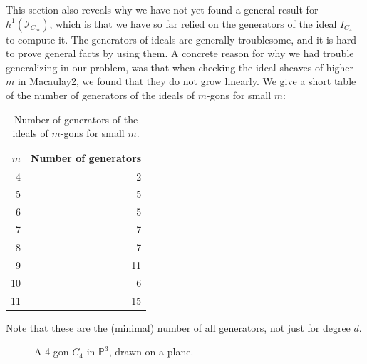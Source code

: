 This section also reveals why we have not yet found a general result for $h^1(\mathcal{I}_{C_m})$, which is that we have so far relied on the generators of the ideal $I_{C_4}$ to compute it. The generators of ideals are generally troublesome, and it is hard to prove general facts by using them. A concrete reason for why we had trouble generalizing in our problem, was that when checking the ideal sheaves of higher $m$ in Macaulay2, we found that they do not grow linearly. We give a short table of the number of generators of the ideals of $m$-gons for small $m$:

\begin{table}[htbp]
    \centering
    \caption{Number of generators of the ideals of $m$-gons for small $m$.}
    \label{tab:num-generators}
    \begin{tabular}{r r }
        \toprule
        $m$ & Number of generators \\
        \midrule
        4 & 2 \\
        5 & 5 \\
        6 & 5 \\
        7 & 7 \\
        8 & 7 \\
        9 & 11 \\
        10 & 6 \\
        11 & 15 \\
        \bottomrule
    \end{tabular}
\end{table}

Note that these are the (minimal) number of all generators, not just for degree $d$.

\begin{figure}
    \centering
    
    \caption{A 4-gon $C_4$ in $\mathbb{P}^3$, drawn on a plane.}
    \label{fig:4-gon}
\end{figure}
